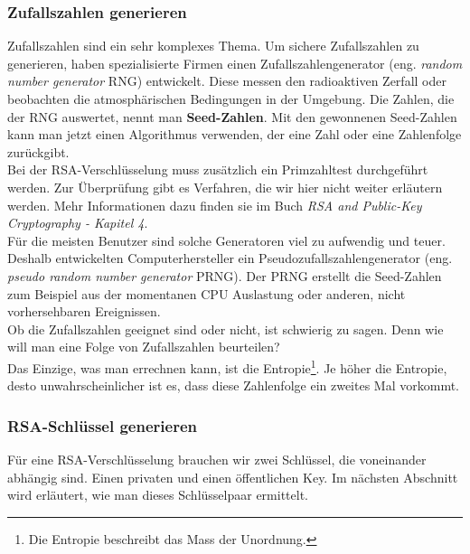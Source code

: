 \subsubsection{Zufallszahlen generieren}
Zufallszahlen sind ein sehr komplexes Thema. Um sichere Zufallszahlen zu generieren, haben spezialisierte Firmen einen Zufallszahlengenerator (eng. \textit{random number generator} RNG) entwickelt. Diese messen den radioaktiven Zerfall oder beobachten die atmosphärischen Bedingungen in der Umgebung. Die Zahlen, die der RNG auswertet, nennt man \textbf{Seed-Zahlen}. Mit den gewonnenen Seed-Zahlen kann man jetzt einen Algorithmus verwenden, der eine Zahl oder eine Zahlenfolge zurückgibt.\\
Bei der RSA-Verschlüsselung muss zusätzlich ein Primzahltest durchgeführt werden.
Zur Überprüfung gibt es Verfahren, die wir hier nicht weiter erläutern werden. Mehr Informationen dazu finden sie im Buch \textit{RSA and Public-Key Cryptography - Kapitel 4}.\\
%
Für die meisten Benutzer sind solche Generatoren viel zu aufwendig und teuer. Deshalb entwickelten Computerhersteller ein Pseudozufallszahlengenerator (eng. \textit{pseudo random number generator} PRNG). Der PRNG erstellt die Seed-Zahlen zum Beispiel aus der momentanen CPU Auslastung oder anderen, nicht vorhersehbaren Ereignissen.\\
Ob die Zufallszahlen geeignet sind oder nicht, ist schwierig zu sagen. Denn wie will man eine Folge von Zufallszahlen beurteilen?\\
Das Einzige, was man errechnen kann, ist die Entropie\footnote{Die Entropie beschreibt das Mass der Unordnung.}. Je höher die Entropie, desto unwahrscheinlicher ist es, dass diese Zahlenfolge ein zweites Mal vorkommt.
\subsubsection{RSA-Schlüssel generieren}
Für eine RSA-Verschlüsselung brauchen wir zwei Schlüssel, die voneinander abhängig sind. Einen privaten und einen öffentlichen Key. Im nächsten Abschnitt wird erläutert, wie man dieses Schlüsselpaar ermittelt.%
%
